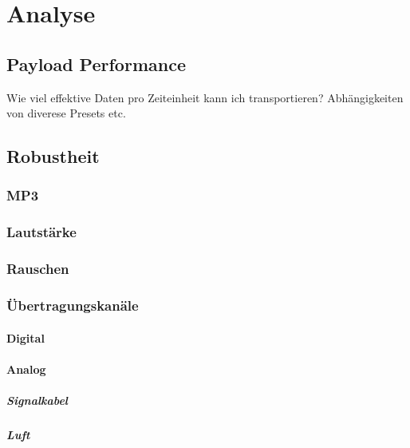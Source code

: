 \chapter{Analyse}
\label{ch:analyse}

\section{Payload Performance}

Wie viel effektive Daten pro Zeiteinheit kann ich transportieren? Abhängigkeiten von diverese Presets etc.

\section{Robustheit}

\subsection{MP3}

\subsection{Lautstärke}

\subsection{Rauschen}

\subsection{Übertragungskanäle}

\subsubsection{Digital}

\subsubsection{Analog}

\paragraph{Signalkabel}

\paragraph{Luft}






